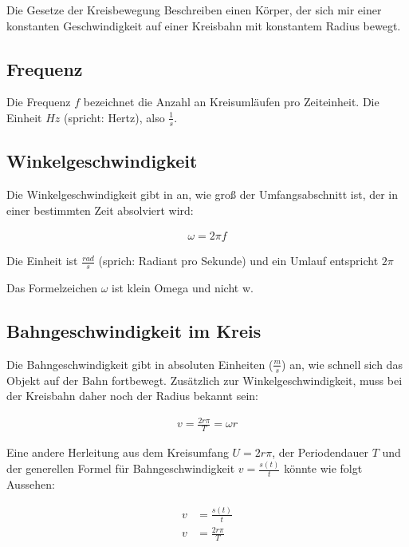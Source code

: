 Die Gesetze der Kreisbewegung Beschreiben einen Körper, der sich mir einer konstanten Geschwindigkeit auf einer Kreisbahn mit konstantem Radius bewegt.


\subsection{Frequenz}

Die Frequenz $f$ bezeichnet die Anzahl an Kreisumläufen pro Zeiteinheit. Die Einheit $Hz$ (spricht: \glqq Hertz\grqq ), also $\frac{1}{s}$.

\subsection{Winkelgeschwindigkeit}

Die Winkelgeschwindigkeit gibt in an, wie groß der Umfangsabschnitt ist, der in einer bestimmten Zeit absolviert wird:

\begin{align}
	\omega = 2 \pi f
\end{align}

\noindent Die Einheit ist $\frac{rad}{s}$ (sprich: \glqq Radiant pro Sekunde\grqq ) und ein Umlauf entspricht $2\pi$

\begin{Wichtig}
Das Formelzeichen $\omega$ ist \glqq klein Omega\grqq{} und nicht \glqq w\grqq .
\end{Wichtig}


\subsection{Bahngeschwindigkeit im Kreis}

Die Bahngeschwindigkeit gibt in absoluten Einheiten ($\frac{m}{s}$) an, wie schnell sich das Objekt auf der Bahn fortbewegt. Zusätzlich zur Winkelgeschwindigkeit, muss bei der Kreisbahn daher noch der Radius bekannt sein:

\begin{align} \label{eq:bahngeschwindigkeit}
	v=\frac{2r\pi}{T}=\omega r
\end{align}

Eine andere Herleitung aus dem Kreisumfang $U=2r\pi$, der Periodendauer $T$ und der generellen Formel für Bahngeschwindigkeit $v=\frac{s(t)}{t}$ könnte wie folgt Aussehen:

\begin{align}
	v&=\frac{s(t)}{t} \\
	v&=\frac{2r\pi}{T}
\end{align}


